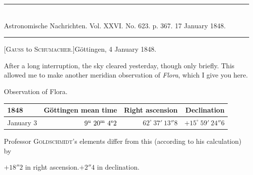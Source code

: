 \clearpage
\hypertarget{native-481-january4}{}
\begin{center}
\rule{0.55\linewidth}{0.4pt}\\[2pt]
Astronomische Nachrichten. Vol. XXVI. No. 623. p. 367. 17 January 1848.\\[2pt]
\rule{0.55\linewidth}{0.4pt}
\end{center}
\begin{center}[\textsc{Gauss} to \textsc{Schumacher}.]\quad Göttingen, 4 January 1848.\end{center}

After a long interruption, the sky cleared yesterday, though only briefly. This allowed me to make another meridian observation of \emph{Flora}, which I give you here.

\begin{center}
Observation of Flora.\\[3pt]
\setlength{\tabcolsep}{4pt}
\begin{tabular}{l|r|r|r}
1848 & Göttingen mean time & Right ascension & Declination \\\hline
January 3 & $9^{\rm u}\ 20^{\rm m}\ 4^{\rm s}2$ & $62^\circ\ 37'\ 13''8$ & $+15^\circ\ 59'\ 24''6$ \\
\end{tabular}
\end{center}

Professor \textsc{Goldschmidt}’s elements differ from this (according to his calculation) by

\begin{center}
$+18''2$ in right ascension.\qquad $+2''4$ in declination.
\end{center}

